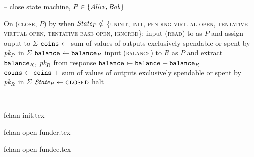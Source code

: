 \begin{center}
\begin{systembox}{\fchan{} -- close state machine, $P \in \{\mathit{Alice},
  \mathit{Bob}\}$}
\begin{algorithmic}[1]
      \State On (\textsc{close}, $P$) by \adversary when $\itistate_P \notin$
      \{\textsc{uninit}, \textsc{init}, \textsc{pending virtual open},
      \textsc{tentative virtual open}, \textsc{tentative base open},
      \textsc{ignored}\}:
      \label{code:functionality:close:check}
      \Indent
        \State input (\textsc{read}) to \ledger as $P$ and assign ouput to
        $\Sigma$
        \State $\texttt{coins}_{} \gets$ sum of values of outputs exclusively spendable
        or spent by $\textit{pk}_{P}$
        in $\Sigma$
        \label{code:functionality:close:coins}
        \State $\texttt{balance}_{} \gets \texttt{balance}_{P}$
          \State input (\textsc{balance}) to $R$ as $P$ and extract
          $\texttt{balance}_{R}$, $\textit{pk}_{R}$ from response
          \State $\texttt{balance}_{} \gets \texttt{balance}_{} + \texttt{balance}_{R}$
          \State $\texttt{coins}_{} \gets \texttt{coins}_{} \:+ $ sum of values of outputs
          exclusively spendable or spent by $\textit{pk}_{R}$ in $\Sigma$
        \EndFor
        \If{$\coins{} \geq \subbalance{}$}
        \label{code:functionality:close:check:if}
          \State $\itistate_P \gets \textsc{closed}$
        \Else \: 
          \State halt
          \label{code:functionality:close:halt}
        \EndIf
      \EndIndent
    \end{algorithmic}
  \end{systembox}
  \label{code:functionality:close}
\end{center} \ \\

\begin{figure*}
  {fchan-init.tex}
  \caption{\fchan state machine up to \textsc{init} (both parties)}
  \label{figure:fchan-state-init}
\end{figure*}

\begin{figure*}
  {fchan-open-funder.tex}
  \caption{\fchan state machine from \textsc{init} up to \textsc{open}
  (funder)}
  \label{figure:fchan-state-open-funder}
\end{figure*}

\begin{figure*}
  {fchan-open-fundee.tex}
  \caption{\fchan state machine from \textsc{init} up to \textsc{open}
  (fundee)}
  \label{figure:fchan-state-open-fundee}
\end{figure*}

